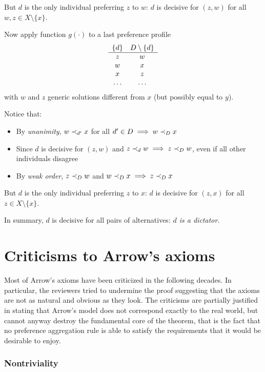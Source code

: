 But $d$ is the only individual preferring $z$ to $w$: $d$ is decisive for $(z, w)$ for all $w, z \in X \setminus \{x\}$.

Now apply function $g (\cdot)$ to a last preference profile 
$$
\begin{array}{c c}
	\{d\} & D \setminus \{d\} \\
	\hline
	z & w \\
	w & x \\
	x & z \\
	\dots & \dots
\end{array}
$$
with $w$ and $z$ generic solutions different from $x$ (but possibly equal to $y$).

Notice that: 
\begin{itemize}
	\item By \textit{unanimity}, $w \prec_{d'} x$ for all $d' \in D \implies w \prec_{D} x$
	
	\item Since $d$ is decisive for $(z,w)$ and $z \prec_{d} w \implies z \prec_{D} w$, even if all other individuals disagree
	
	\item By \textit{weak order}, $z \prec_{D} w$ and $w \prec_{D} x \implies z \prec_{D} x$
\end{itemize}

But $d$ is the only individual preferring $z$ to $x$: $d$ is decisive for $(z, x)$ for all $z \in X \setminus \{x\}$.

In summary, $d$ is decisive for all pairs of alternatives: \textit{$d$ is a dictator.}

\section{Criticisms to Arrow's axioms}

Most of Arrow's axioms have been criticized in the following decades. In particular, the reviewers tried to undermine the proof suggesting that the axioms are not as natural and obvious as they look. The criticisms are partially justified in stating that Arrow's model does not correspond exactly to the real world, but cannot anyway destroy the fundamental core of the theorem, that is the fact that no preference aggregation rule is able to satisfy the requirements that it would be desirable to enjoy.

\subsubsection{Nontriviality}

